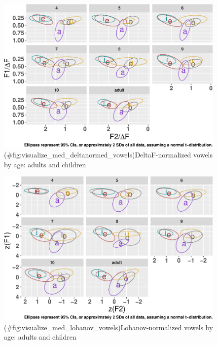 \documentclass[
]{article}
\begin{document}
\begin{figure}
\centering
\includegraphics{3_vtl_results_files/figure-latex/visualize_med_deltanormed_vowels-1.pdf}
\caption{(\#fig:visualize\_med\_deltanormed\_vowels)DeltaF-normalized vowels by age: adults and children}
\end{figure}

\begin{figure}
\centering
\includegraphics{3_vtl_results_files/figure-latex/visualize_med_lobanov_vowels-1.pdf}
\caption{(\#fig:visualize\_med\_lobanov\_vowels)Lobanov-normalized vowels by age: adults and children}
\end{figure}
\end{document}
